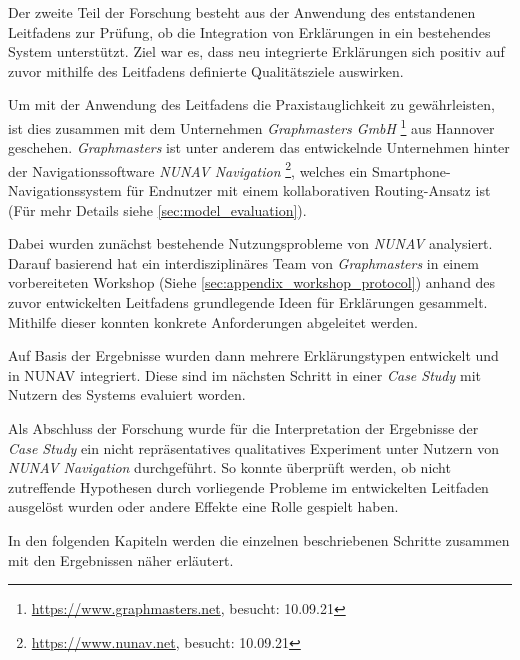 \bigbreak

Der zweite Teil der Forschung besteht aus der Anwendung des entstandenen Leitfadens zur Prüfung, ob die Integration von Erklärungen in ein bestehendes System unterstützt. Ziel war es, dass neu integrierte Erklärungen sich positiv auf zuvor mithilfe des Leitfadens definierte Qualitätsziele auswirken.

Um mit der Anwendung des Leitfadens die Praxistauglichkeit zu gewährleisten, ist dies zusammen mit dem Unternehmen \textit{Graphmasters GmbH} \footnote{\url{https://www.graphmasters.net}, besucht: 10.09.21} aus Hannover geschehen. \textit{Graphmasters} ist unter anderem das entwickelnde Unternehmen hinter der Navigationssoftware \textit{NUNAV Navigation} \footnote{\url{https://www.nunav.net}, besucht: 10.09.21}, welches ein Smartphone-Navigationssystem für Endnutzer mit einem kollaborativen Routing-Ansatz ist (Für mehr Details siehe \autoref{sec:model_evaluation}).

Dabei wurden zunächst bestehende Nutzungsprobleme von \textit{NUNAV} analysiert. Darauf basierend hat ein interdisziplinäres Team von \textit{Graphmasters} in einem vorbereiteten Workshop (Siehe \autoref{sec:appendix_workshop_protocol}) anhand des zuvor entwickelten Leitfadens grundlegende Ideen für Erklärungen gesammelt. Mithilfe dieser konnten konkrete Anforderungen abgeleitet werden.

Auf Basis der Ergebnisse wurden dann mehrere Erklärungstypen entwickelt und in NUNAV integriert. Diese sind im nächsten Schritt in einer \textit{Case Study} mit Nutzern des Systems evaluiert worden.

Als Abschluss der Forschung wurde für die Interpretation der Ergebnisse der \textit{Case Study} ein nicht repräsentatives qualitatives Experiment unter Nutzern von \textit{NUNAV Navigation} durchgeführt. So konnte überprüft werden, ob nicht zutreffende Hypothesen durch vorliegende Probleme im entwickelten Leitfaden ausgelöst wurden oder andere Effekte eine Rolle gespielt haben.

\bigskip

In den folgenden Kapiteln werden die einzelnen beschriebenen Schritte zusammen mit den Ergebnissen näher erläutert.
